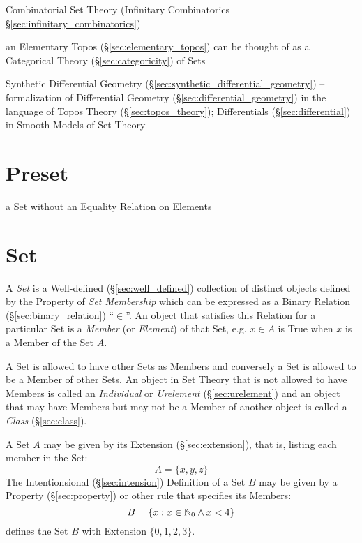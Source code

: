 \fist Combinatorial Set Theory (Infinitary Combinatorics
\S\ref{sec:infinitary_combinatorics})

an Elementary Topos (\S\ref{sec:elementary_topos}) can be thought of as a
Categorical Theory (\S\ref{sec:categoricity}) of Sets

\fist Synthetic Differential Geometry
(\S\ref{sec:synthetic_differential_geometry}) -- formalization of Differential
Geometry (\S\ref{sec:differential_geometry}) in the language of Topos Theory
(\S\ref{sec:topos_theory}); Differentials (\S\ref{sec:differential}) in Smooth
Models of Set Theory



\section{Preset}\label{sec:preset}

a Set without an Equality Relation on Elements



\section{Set}\label{sec:set}

A \emph{Set} is a Well-defined (\S\ref{sec:well_defined}) collection
of distinct objects defined by the Property of \emph{Set Membership}
which can be expressed as a Binary Relation
(\S\ref{sec:binary_relation}) ``$\in$''. An object that satisfies this
Relation for a particular Set is a \emph{Member} (or \emph{Element})
of that Set, e.g. $x \in A$ is True when $x$ is a Member of the Set
$A$.

A Set is allowed to have other Sets as Members and conversely a Set is
allowed to be a Member of other Sets. An object in Set Theory that is
not allowed to have Members is called an \emph{Individual} or
\emph{Urelement} (\S\ref{sec:urelement}) and an object that may have
Members but may not be a Member of another object is called a
\emph{Class} (\S\ref{sec:class}).

A Set $A$ may be given by its Extension (\S\ref{sec:extension}), that
is, listing each member in the Set:
\[
  A = \{x,y,z\}
\]
The Intentionsional (\S\ref{sec:intension}) Definition of a Set $B$
may be given by a Property (\S\ref{sec:property}) or other rule that
specifies its Members:
\[
  B = \{ x : x \in \mathbb{N}_0 \wedge x < 4 \}
\]
defines the Set $B$ with Extension $\{ 0, 1, 2, 3 \}$.

